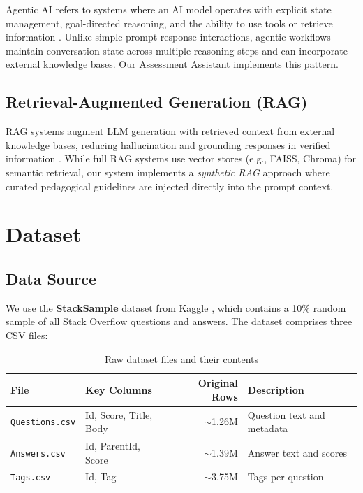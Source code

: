 \documentclass[12pt, a4paper]{article}
\begin{document}
Agentic AI refers to systems where an AI model operates with explicit state management, goal-directed reasoning, and the ability to use tools or retrieve information \citep{yao2023react}. Unlike simple prompt-response interactions, agentic workflows maintain conversation state across multiple reasoning steps and can incorporate external knowledge bases. Our Assessment Assistant implements this pattern.

\subsection{Retrieval-Augmented Generation (RAG)}

RAG systems augment LLM generation with retrieved context from external knowledge bases, reducing hallucination and grounding responses in verified information \citep{lewis2020rag}. While full RAG systems use vector stores (e.g., FAISS, Chroma) for semantic retrieval, our system implements a \emph{synthetic RAG} approach where curated pedagogical guidelines are injected directly into the prompt context.

\section{Dataset}
\label{sec:dataset}

\subsection{Data Source}

We use the \textbf{StackSample} dataset from Kaggle \citep{stacksample}, which contains a 10\% random sample of all Stack Overflow questions and answers. The dataset comprises three CSV files:

\begin{table}[H]
\centering
\caption{Raw dataset files and their contents}
\label{tab:raw-data}
\begin{tabular}{llrl}
\toprule
\textbf{File} & \textbf{Key Columns} & \textbf{Original Rows} & \textbf{Description} \\
\midrule
\texttt{Questions.csv} & Id, Score, Title, Body & $\sim$1.26M & Question text and metadata \\
\texttt{Answers.csv}   & Id, ParentId, Score    & $\sim$1.39M & Answer text and scores \\
\texttt{Tags.csv}      & Id, Tag                & $\sim$3.75M & Tags per question \\
\bottomrule
\end{tabular}
\end{table}
\end{document}
